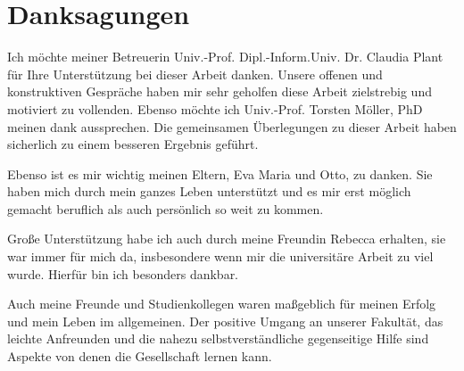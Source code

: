 

\chapter*{Danksagungen} %
\label{cha:acknowledgements}
\noindent

Ich möchte meiner Betreuerin Univ.-Prof. Dipl.-Inform.Univ. Dr. Claudia Plant für Ihre Unterstützung bei dieser Arbeit danken. Unsere offenen und konstruktiven Gespräche haben mir sehr geholfen diese Arbeit zielstrebig und motiviert zu vollenden. Ebenso möchte ich Univ.-Prof. Torsten Möller, PhD meinen dank aussprechen. Die gemeinsamen Überlegungen zu dieser Arbeit haben sicherlich zu einem besseren Ergebnis geführt.

Ebenso ist es mir wichtig meinen Eltern, Eva Maria und Otto, zu danken. Sie haben mich durch mein ganzes Leben unterstützt und es mir erst möglich gemacht beruflich als auch persönlich so weit zu kommen.

Große Unterstützung habe ich auch durch meine Freundin Rebecca erhalten, sie war immer für mich da, insbesondere wenn mir die universitäre Arbeit zu viel wurde. Hierfür bin ich besonders dankbar.

Auch meine Freunde und Studienkollegen waren maßgeblich für meinen Erfolg und mein Leben im allgemeinen. Der positive Umgang an unserer Fakultät, das leichte Anfreunden und die nahezu selbstverständliche gegenseitige Hilfe sind Aspekte von denen die Gesellschaft lernen kann.

